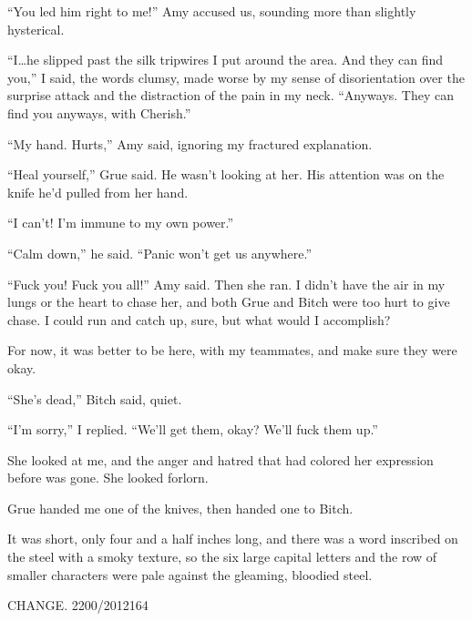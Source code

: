 ``You led him right to me!''  Amy accused us, sounding more than slightly hysterical.



``I\ldots he slipped past the silk tripwires I put around the area.  And they can find you,'' I said, the words clumsy, made worse by my sense of disorientation over the surprise attack and the distraction of the pain in my neck.  ``Anyways.  They can find you anyways, with Cherish.''



``My hand.  Hurts,'' Amy said, ignoring my fractured explanation.



``Heal yourself,'' Grue said.  He wasn't looking at her.  His attention was on the knife he'd pulled from her hand.



``I can't!  I'm immune to my own power.''



``Calm down,'' he said.  ``Panic won't get us anywhere.''



``Fuck you!  Fuck you all!'' Amy said.  Then she ran.  I didn't have the air in my lungs or the heart to chase her, and both Grue and Bitch were too hurt to give chase.  I could run and catch up, sure, but what would I accomplish?



For now, it was better to be here, with my teammates, and make sure they were okay.



``She's dead,'' Bitch said, quiet.



``I'm sorry,'' I replied.  ``We'll get them, okay?  We'll fuck them up.''



She looked at me, and the anger and hatred that had colored her expression before was gone.  She looked forlorn.



Grue handed me one of the knives, then handed one to Bitch.



It was short, only four and a half inches long, and there was a word inscribed on the steel with a smoky texture, so the six large capital letters and the row of smaller characters were pale against the gleaming, bloodied steel.



CHANGE.
2200/2012164



